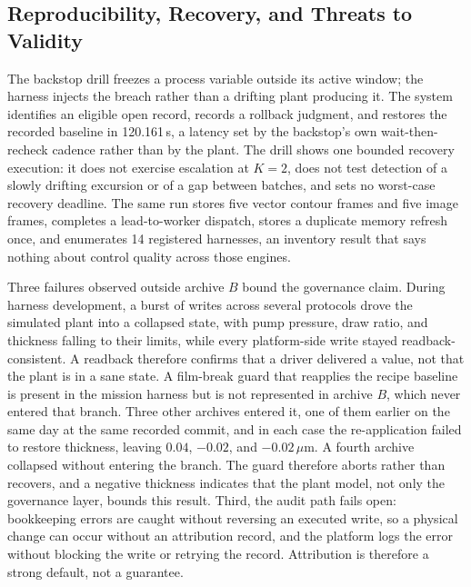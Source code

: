 \subsection{Reproducibility, Recovery, and Threats to Validity}
\label{sec:e1a}
\label{sec:repro}
The backstop drill freezes a process variable outside its active window; the harness
injects the breach rather than a drifting plant producing it. The system identifies
an eligible open record, records a rollback judgment, and restores the recorded
baseline in 120.161\,s, a latency set by the backstop's own wait-then-recheck cadence
rather than by the plant. The drill shows one bounded recovery execution: it does
not exercise escalation at $K=2$, does not test detection of a slowly drifting
excursion or of a gap between batches, and sets no worst-case recovery deadline. The
same run stores five vector contour frames and five image frames, completes a
lead-to-worker dispatch, stores a duplicate memory refresh once, and enumerates 14 registered
harnesses, an inventory result that says nothing about control quality across those
engines.

Three failures observed outside archive $B$ bound the governance claim. During harness
development, a burst of writes across several protocols drove the simulated plant
into a collapsed state, with pump pressure, draw ratio, and thickness falling to
their limits, while every platform-side write stayed readback-consistent. A readback
therefore confirms that a driver delivered a value, not that the plant is in a sane
state. A film-break guard that reapplies the recipe baseline is present in the mission harness but is not represented in archive $B$, which never entered that branch. Three other archives entered it, one of them earlier on the same day at the same recorded commit, and in each case the re-application failed to restore thickness, leaving $0.04$, $-0.02$, and $-0.02\,\mu$m. A fourth archive collapsed without entering the branch. The guard therefore aborts rather than recovers, and a negative thickness indicates that the plant model, not only the governance layer, bounds this result. Third, the audit path fails open: bookkeeping errors are caught without reversing an executed write,
so a physical change can occur without an attribution record, and the platform logs
the error without blocking the write or retrying the record. Attribution is
therefore a strong default, not a guarantee.

